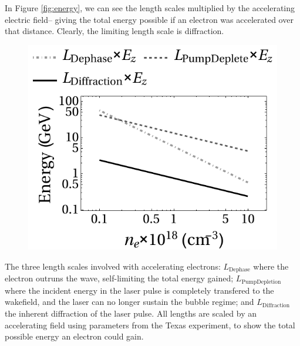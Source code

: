 \documentclass[12pt, titlepage]{article}
\begin{document}
    In Figure \ref{fig:energy}, we can see the length scales multiplied by the
    accelerating electric field-- giving the total energy possible if an
    electron was accelerated over that distance. Clearly, the limiting length
    scale is diffraction.
    \begin{marginfigure}
        \begin{subfigure}[t]{\marginparwidth}
            \includegraphics[width=\linewidth]{../figures/energy.pdf}
        \end{subfigure}
        \caption{The three length scales involved with accelerating electrons:
        $L_\mathrm{Dephase}$ where the electron outruns the wave, self-limiting
    the total energy gained; $L_\mathrm{Pump Depletion}$ where the incident
energy in the laser pulse is completely transfered to the wakefield, and the
laser can no longer sustain the bubble regime; and $L_\mathrm{Diffraction}$ the
inherent diffraction of the laser pulse. All lengths are scaled by an
accelerating field using parameters from the Texas
experiment\cite{Wang2013}, to show the total possible energy an electron
could gain.\label{fig:energy}}
    \end{marginfigure}
\end{document}
